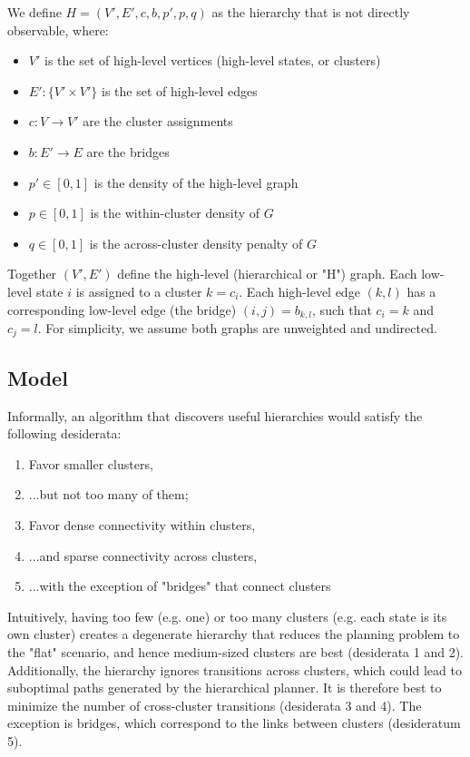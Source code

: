 \documentclass[11pt]{article}
\begin{document}
We define $H = (V', E', c, b, p', p, q)$ as the hierarchy that is not directly observable, where:

\begin{itemize}
    \item $V'$ is the set of high-level vertices (high-level states, or clusters)
    \item $E': \{V' \times V'\}$ is the set of high-level edges
    \item $c: V \rightarrow V'$ are the cluster assignments
    \item $b: E' \rightarrow E$ are the bridges
    \item $p' \in [0, 1]$ is the density of the high-level graph
    \item $p \in [0, 1]$ is the within-cluster density of $G$
    \item $q \in [0, 1]$ is the across-cluster density penalty of $G$
\end{itemize}

Together $(V', E')$ define the high-level (hierarchical or "H") graph. Each low-level state $i$ is assigned to a cluster $k = c_i$. Each high-level edge $(k,l)$ has a corresponding low-level edge (the bridge) $(i,j) = b_{k,l}$, such that $c_i = k$ and $c_j = l$. For simplicity, we assume both graphs are unweighted and undirected.

\subsection{Model}

Informally, an algorithm that discovers useful hierarchies would satisfy the following desiderata:

\begin{enumerate}
    \item Favor smaller clusters,
    \item ...but not too many of them;
    \item Favor dense connectivity within clusters, %
    \item ...and sparse connectivity across clusters, 
    \item ...with the exception of "bridges" that connect clusters
\end{enumerate}

Intuitively, having too few (e.g. one) or too many clusters (e.g. each state is its own cluster) creates a degenerate hierarchy that reduces the planning problem to the "flat" scenario, and hence medium-sized clusters are best (desiderata 1 and 2). Additionally, the hierarchy ignores transitions across clusters, which could lead to suboptimal paths generated by the hierarchical planner. It is therefore best to minimize the number of cross-cluster transitions (desiderata 3 and 4). The exception is bridges, which correspond to the links between clusters (desideratum 5). 
\end{document}
